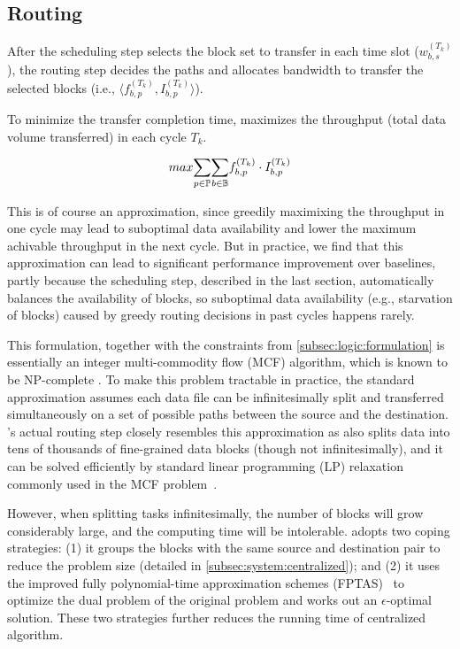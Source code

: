 \subsection{Routing}
\label{subsec:logic:routing}

After the scheduling step selects the block set to transfer in each 
time slot ($w^{(T_k)}_{b,s}$), the routing step decides the paths and 
allocates bandwidth to transfer the selected blocks (i.e.,
$\langle f_{b,p}^{(T_k)}, I_{b,p}^{(T_k)}\rangle$).

To minimize the transfer completion time, \name maximizes the 
throughput (total data volume transferred) in each cycle $T_k$. 

\begin{equation}
\centering
max \displaystyle{\sum_{p\in \mathbb{P}}} 
\displaystyle{\sum_{b\in \mathbb{B}}} 
f_{b,p}^{(T_k)} \cdot I_{b,p}^{(T_k)}
\end{equation}

This is of course an approximation, since greedily maximixing the 
throughput in one cycle may lead to suboptimal data availability and 
lower the maximum achivable throughput in the next cycle. But in 
practice, we find that this approximation can lead to significant 
performance improvement over baselines, partly because the scheduling 
step, described in the last section, automatically balances the 
availability of blocks, so suboptimal data availability (e.g., 
starvation of blocks) caused by greedy routing decisions in past 
cycles happens rarely.

This formulation, together with the constraints from 
\Section\ref{subsec:logic:formulation} is essentially an integer 
multi-commodity flow (MCF) algorithm, which is known to be 
NP-complete \cite{garg1997primal}. To make this problem tractable in 
practice, the standard approximation assumes each data file can be 
infinitesimally split and transferred simultaneously on a set of 
possible paths between the source and the destination. \name's actual
routing step closely resembles this approximation as \name also 
splits data into tens of thousands of fine-grained data blocks 
(though not infinitesimally), and it can be solved efficiently by 
standard linear programming (LP) relaxation commonly used in the MCF 
problem~\cite{garg2007faster,reed2012traffic}.

However, when splitting tasks infinitesimally, the number of blocks 
will grow considerably large, and the computing time will be 
intolerable. \name adopts two coping strategies: (1) it groups the 
blocks with the same source and destination pair to reduce the 
problem size (detailed in \Section\ref{subsec:system:centralized}); 
and (2) it uses the improved fully polynomial-time approximation 
schemes (FPTAS)~\cite{fleischer2000approximating} to optimize the 
dual problem of the original problem and works out an 
$\epsilon$-optimal solution. These two strategies further reduces the 
running time of centralized algorithm.





